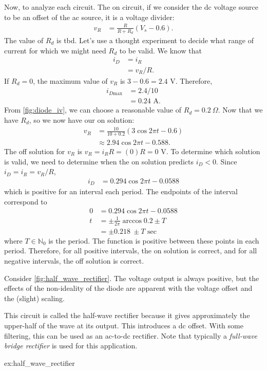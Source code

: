 \documentclass[electronics.tex]{subfiles}
\begin{document}
{  Now, to analyze each circuit.
  The on circuit, if we consider the dc voltage source to be an offset of the ac source, it is a voltage divider:
  \begin{align*}
  	v_R &= \frac{R}{R+R_d} (V_s-0.6).
  \end{align*}
  The value of $R_d$ is tbd.
  Let's use a thought experiment to decide what range of current for which we might need $R_d$ to be valid.
  We know that
  \begin{align*}
  	i_D 
  	&= i_R \\
  	&= v_R/R. 
  \end{align*}
  If $R_d = 0$, the maximum value of $v_R$ is $3-0.6 = 2.4$ V.
  Therefore,
  \begin{align*}
  	i_{D\text{max}} &= 2.4/10 \\
  	&= 0.24\text{ A}.
  \end{align*}
  From \autoref{fig:diode_iv}, we can choose a reasonable value of $R_d = 0.2\ \Omega$.
  Now that we have $R_d$, so we now have our on solution:
  \begin{align*}
  	v_R &= \frac{10}{10+0.2} (3 \cos 2\pi t - 0.6) \\
  	&\approx 2.94 \cos 2\pi t - 0.588.
  \end{align*}
  The off solution for $v_R$ is $v_R = i_R R = (0) R = 0$ V.
  To determine which solution is valid, we need to determine when the on solution predicts $i_D < 0$.
  Since $i_D = i_R = v_R/R$,
  \begin{align*}
  	i_D &= 0.294 \cos 2\pi t - 0.0588
  \end{align*}
  which is positive for an interval each period.
  The endpoints of the interval correspond to
  \begin{align*}
  	0 &= 0.294 \cos 2\pi t - 0.0588 \\
  	t &= \pm\frac{1}{2\pi}\arccos{0.2} \pm T \\
  	&= \pm 0.218\ \pm T \text{ sec}
  \end{align*}
  where $T \in \mathbb{N}_0$ is the period.
  The function is positive between these points in each period.
  Therefore, for all positive intervals, the on solution is correct, and for all negative intervals, the off solution is correct.

  Consider \autoref{fig:half_wave_rectifier}. The voltage output is always positive, but the effects of the non-ideality of the diode are apparent with the voltage offset and the (slight) scaling.

  This circuit is called the half-wave rectifier because it gives approximately the upper-half of the wave at its output.
  This introduces a dc offset.
  With some filtering, this can be used as an ac-to-dc rectifier.
  Note that typically a \emph{full-wave bridge rectifier} is used for this application.
}{%
ex:half_wave_rectifier%
}
\end{document}
